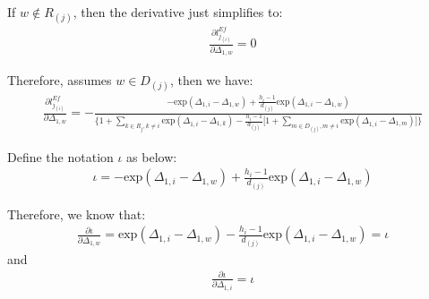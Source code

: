 \documentclass[]{article}
\begin{document}
If \(w \notin R_{(j)}\), then the derivative just simplifies to:
\begin{equation}\begin{aligned}\label{eqn:Efron6}
\frac{\partial l_{j_{(i)}}^{Ef}}{\partial \Delta_{1,w}} = 0
\end{aligned}\end{equation}

Therefore, assumes \(w \in D_{(j)}\), then we have:
\begin{equation}\begin{aligned}\label{eqn:Efron7}
\frac{\partial l_{j_{(i)}}^{Ef}}{\partial \Delta_{1,w}} = -\frac{-\text{exp}(\Delta_{1,i}-\Delta_{1,w})+\frac{h_i-1}{d_{(j)}}\text{exp}(\Delta_{1,i}-\Delta_{1,w})}{\bigg\{1+\sum_{k\in R_j, k\neq i}\text{exp}(\Delta_{1,i}-\Delta_{1,k})-\frac{h_i-1}{d_{(j)}}\big[1+\sum_{m\in D_{(j)}, m\neq i}\text{exp}(\Delta_{1,i}-\Delta_{1,m})\big]\bigg\}}
\end{aligned}\end{equation}

Define the notation \(\iota\) as below:
\begin{equation}\begin{aligned}\label{eqn:DefEfron1}
\iota = -\text{exp}(\Delta_{1,i}-\Delta_{1,w})+\frac{h_i-1}{d_{(j)}}\text{exp}(\Delta_{1,i}-\Delta_{1,w})
\end{aligned}\end{equation}

Therefore, we know that:
\begin{equation}\begin{aligned}\label{eqn:DefEfron1know}
\frac{\partial\iota}{\partial\Delta_{1,w}}=\text{exp}(\Delta_{1,i}-\Delta_{1,w})-\frac{h_i-1}{d_{(j)}}\text{exp}(\Delta_{1,i}-\Delta_{1,w}) = \iota
\end{aligned}\end{equation} and
\begin{equation}\begin{aligned}\label{eqn:DefEfron1know2}
\frac{\partial\iota}{\partial\Delta_{1,i}}=\iota
\end{aligned}\end{equation}
\end{document}
